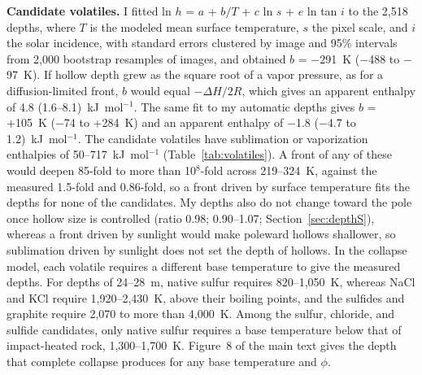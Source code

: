 \documentclass{planetary}
\begin{document}
\textbf{Candidate volatiles.} I fitted ln $h$ = $a$ + $b/T$ + $c$ ln $s$ + $e$ ln tan $i$ to the 2,518 depths, where $T$ is the modeled mean surface temperature, $s$ the pixel scale, and $i$ the solar incidence, with standard errors clustered by image and 95\% intervals from 2,000 bootstrap resamples of images, and obtained $b$ = $-$291~K ($-$488 to $-$97~K). If hollow depth grew as the square root of a vapor pressure, as for a diffusion-limited front, $b$ would equal $-\Delta H/2R$, which gives an apparent enthalpy of 4.8 (1.6--8.1)~kJ~mol$^{-1}$. The same fit to my automatic depths gives $b$ = +105~K ($-$74 to +284~K) and an apparent enthalpy of $-$1.8 ($-$4.7 to 1.2)~kJ~mol$^{-1}$. The candidate volatiles have sublimation or vaporization enthalpies of 50--717~kJ~mol$^{-1}$ (Table~\ref{tab:volatiles}). A front of any of these would deepen 85-fold to more than 10$^{8}$-fold across 219--324~K, against the measured 1.5-fold and 0.86-fold, so a front driven by surface temperature fits the depths for none of the candidates. My depths also do not change toward the pole once hollow size is controlled (ratio 0.98; 0.90--1.07; Section~\ref{sec:depthS}), whereas a front driven by sunlight would make poleward hollows shallower, so sublimation driven by sunlight does not set the depth of hollows. In the collapse model, each volatile requires a different base temperature to give the measured depths. For depths of 24--28~m, native sulfur requires 820--1,050~K, whereas NaCl and KCl require 1,920--2,430~K, above their boiling points, and the sulfides and graphite require 2,070 to more than 4,000~K. Among the sulfur, chloride, and sulfide candidates, only native sulfur requires a base temperature below that of impact-heated rock, 1,300--1,700~K. Figure~8 of the main text gives the depth that complete collapse produces for any base temperature and $\phi$.
\end{document}
